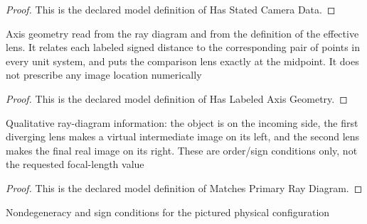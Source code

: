 \begin{proof}
  This is the declared model definition of Has Stated Camera Data.
\end{proof}
\begin{definition}
  \label{def:physics:phyx-mini-0165:phyxminiproblems-problemphyxmini0165-haslabeledaxisgeometry}
  Axis geometry read from the ray diagram and from the definition of the effective lens. It relates each labeled signed distance to the corresponding pair of points in every unit system, and puts the comparison lens exactly at the midpoint. It does not prescribe any image location numerically
\end{definition}
\begin{proof}
  This is the declared model definition of Has Labeled Axis Geometry.
\end{proof}
\begin{definition}
  \label{def:physics:phyx-mini-0165:phyxminiproblems-problemphyxmini0165-matchesprimaryraydiagram}
  Qualitative ray-diagram information: the object is on the incoming side, the first diverging lens makes a virtual intermediate image on its left, and the second lens makes the final real image on its right. These are order/sign conditions only, not the requested focal-length value
\end{definition}
\begin{proof}
  This is the declared model definition of Matches Primary Ray Diagram.
\end{proof}
\begin{definition}
  \label{def:physics:phyx-mini-0165:phyxminiproblems-problemphyxmini0165-hasphysicalsignconfiguration}
  Nondegeneracy and sign conditions for the pictured physical configuration
\end{definition}
